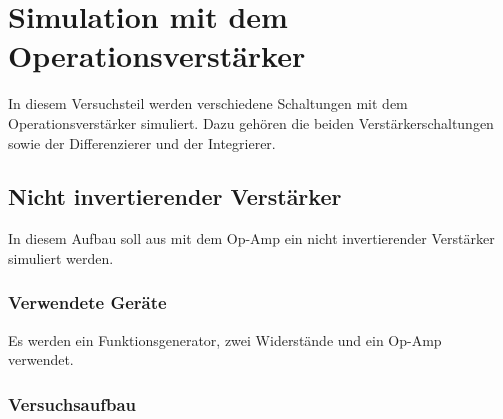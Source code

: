 \documentclass[12pt,a4paper]{article}
\begin{document}
\section{Simulation mit dem Operationsverstärker}

In diesem Versuchsteil werden verschiedene Schaltungen mit dem Operationsverstärker simuliert. Dazu gehören die beiden Verstärkerschaltungen sowie der Differenzierer und der Integrierer.

\subsection{Nicht invertierender Verstärker}

In diesem Aufbau soll aus mit dem Op-Amp ein nicht invertierender Verstärker simuliert werden.

\subsubsection{Verwendete Geräte}

Es werden ein Funktionsgenerator, zwei Widerstände und ein Op-Amp verwendet.


\subsubsection{Versuchsaufbau}
\end{document}
